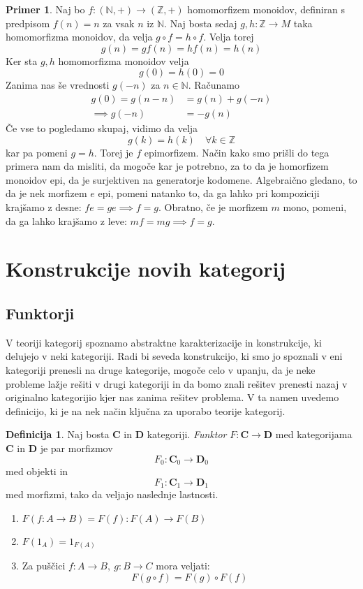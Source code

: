 \documentclass[12pt,a4paper]{book}
\theoremstyle{definition}
\newtheorem{definicija}{Definicija}[chapter]
\theoremstyle{plain}
\theoremstyle{definition}
\newtheorem{primer}{Primer}[section]
\theoremstyle{remark}
\newcommand{\cat}[1]{\textbf{#1}}
\begin{document}
\begin{primer}
Naj bo $f : (\mathbb{N},+) \to (\mathbb{Z},+)$ homomorfizem monoidov, definiran s predpisom $f(n) = n$ za vsak $n$ iz $\mathbb{N}$. Naj bosta sedaj $g,h: \mathbb{Z} \to M$ taka homomorfizma monoidov, da velja $g \circ f = h \circ f$. 
Velja torej $$g(n) = gf(n) = hf(n) = h(n)$$
Ker sta $g,h$ homomorfizma monoidov velja
$$g(0) = h(0) = 0$$
Zanima nas še vrednosti $g(-n)$ za $n \in \mathbb{N}$. 
Računamo 
\begin{align*}
g(0) = g(n - n) &= g(n) + g(-n) \\
\implies g(-n) &= -g(n)
\end{align*}
Če vse to pogledamo skupaj, vidimo da velja
$$g(k) = h(k) \quad \forall k \in \mathbb{Z}$$
kar pa pomeni $g = h$. Torej je $f$ epimorfizem. Način kako smo prišli do tega primera nam da misliti, da mogoče kar je potrebno, za to da je homorfizem monoidov epi, da je surjektiven na generatorje kodomene.
Algebraično gledano, to da je nek morfizem $e$ epi, pomeni natanko to, da ga lahko pri kompoziciji krajšamo z desne: $fe = ge \implies f=g$. Obratno, če je morfizem $m$ mono, pomeni, da ga lahko krajšamo z leve: $mf = mg \implies f = g$.

\end{primer}


\section{Konstrukcije novih kategorij}

\subsection{Funktorji}

V teoriji kategorij spoznamo abstraktne karakterizacije in konstrukcije, ki delujejo v neki kategoriji. Radi bi seveda konstrukcijo, ki smo jo spoznali v eni kategoriji prenesli na druge kategorije, mogoče celo v upanju, da je neke probleme lažje rešiti v drugi kategoriji in da bomo znali rešitev prenesti nazaj v originalno kategorijio kjer nas zanima rešitev problema. V ta namen uvedemo definicijo, ki je na nek način ključna za uporabo teorije kategorij.

\begin{definicija}
Naj bosta $\cat{C}$ in $\cat{D}$ kategoriji. \emph{Funktor} $F : \cat{C} \to \cat{D}$ med kategorijama $\cat{C}$ in $\cat{D}$ je par morfizmov
$$F_0 : \cat{C}_0 \to \cat{D}_0$$
med objekti in
$$F_1 : \cat{C}_1 \to \cat{D}_1$$
med morfizmi, tako da veljajo naslednje lastnosti.
\begin{enumerate}
\item $F(f : A \to B) = F(f) : F(A) \to F(B)$
\item $F(1_A) = 1_{F(A)}$
\item Za puščici $f : A \to B, \ g : B \to C$ mora veljati:
$$F(g \circ f) = F(g) \circ F(f)$$
\end{enumerate}
\end{definicija}
\end{document}
